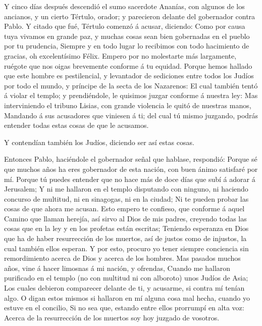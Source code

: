  Y cinco días después descendió el sumo sacerdote Ananías,
con algunos de los ancianos, y un cierto Tértulo, orador; y parecieron
delante del gobernador contra Pablo.  Y citado que fué,
Tértulo comenzó á acusar, diciendo: Como por causa tuya vivamos en
grande paz, y muchas cosas sean bien gobernadas en el pueblo por tu
prudencia,  Siempre y en todo lugar lo recibimos con todo
hacimiento de gracias, oh excelentísimo Félix.  Empero por
no molestarte más largamente, ruégote que nos oigas brevemente conforme
á tu equidad.  Porque hemos hallado que este hombre es
pestilencial, y levantador de sediciones entre todos los Judíos por todo
el mundo, y príncipe de la secta de los Nazarenos:  El cual
también tentó á violar el templo; y prendiéndole, le quisimos juzgar
conforme á nuestra ley:  Mas interviniendo el tribuno
Lisias, con grande violencia le quitó de nuestras manos, 
Mandando á sus acusadores que viniesen á ti; del cual tú mismo juzgando,
podrás entender todas estas cosas de que le acusamos.

 Y contendían también los Judíos, diciendo ser así estas
cosas.

 Entonces Pablo, haciéndole el gobernador señal que
hablase, respondió: Porque sé que muchos años ha eres gobernador de esta
nación, con buen ánimo satisfaré por mí.  Porque tú puedes
entender que no hace más de doce días que subí á adorar á Jerusalem;
 Y ni me hallaron en el templo disputando con ninguno, ni
haciendo concurso de multitud, ni en sinagogas, ni en la ciudad;
 Ni te pueden probar las cosas de que ahora me acusan.
 Esto empero te confieso, que conforme á aquel Camino que
llaman herejía, así sirvo al Dios de mis padres, creyendo todas las
cosas que en la ley y en los profetas están escritas; 
Teniendo esperanza en Dios que ha de haber resurrección de los muertos,
así de justos como de injustos, la cual también ellos esperan.
 Y por esto, procuro yo tener siempre conciencia sin
remordimiento acerca de Dios y acerca de los hombres.  Mas
pasados muchos años, vine á hacer limosnas á mi nación, y ofrendas,
 Cuando me hallaron purificado en el templo (no con
multitud ni con alboroto) unos Judíos de Asia;  Los cuales
debieron comparecer delante de ti, y acusarme, si contra mí tenían algo.
 O digan estos mismos si hallaron en mí alguna cosa mal
hecha, cuando yo estuve en el concilio,  Si no sea que,
estando entre ellos prorrumpí en alta voz: Acerca de la resurrección de
los muertos soy hoy juzgado de vosotros.

